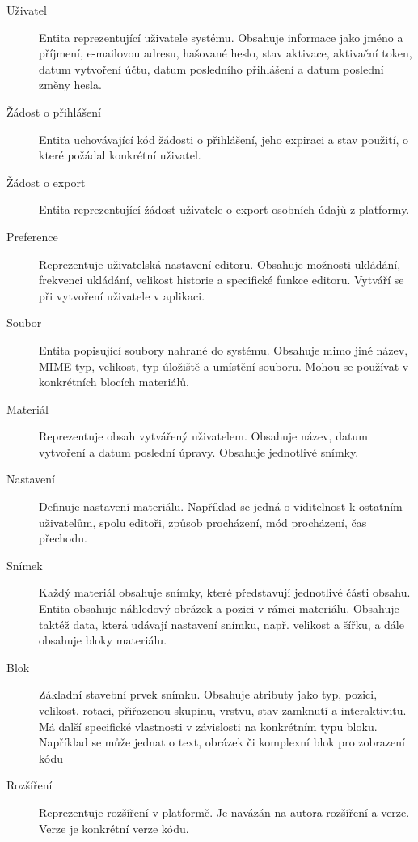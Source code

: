 \begin{description}
    \item[Uživatel] 
    Entita reprezentující uživatele systému. Obsahuje informace jako jméno a příjmení, e-mailovou adresu, hašované heslo, stav aktivace, aktivační token, datum vytvoření účtu, datum posledního přihlášení a datum poslední změny hesla.

    \item[Žádost o přihlášení] 
    Entita uchovávající kód žádosti o přihlášení, jeho expiraci a stav použití, o které požádal konkrétní uživatel.
    
    \item[Žádost o export]
    Entita reprezentující žádost uživatele o export osobních údajů z platformy.
    
    \item[Preference] 
    Reprezentuje uživatelská nastavení editoru. Obsahuje možnosti ukládání, frekvenci ukládání, velikost historie a specifické funkce editoru. Vytváří se při vytvoření uživatele v aplikaci.

    \item[Soubor] 
    Entita popisující soubory nahrané do systému. Obsahuje mimo jiné název, MIME typ, velikost, typ úložiště a umístění souboru. Mohou se používat v konkrétních blocích materiálů.
    
    \item[Materiál] 
    Reprezentuje obsah vytvářený uživatelem. Obsahuje název, datum vytvoření a datum poslední úpravy. Obsahuje jednotlivé snímky.
    
    \item[Nastavení] 
    Definuje nastavení materiálu. Například se jedná o viditelnost k ostatním uživatelům, spolu editoři, způsob procházení, mód procházení, čas přechodu.
    
    \item[Snímek] 
    Každý materiál obsahuje snímky, které představují jednotlivé části obsahu. Entita obsahuje náhledový obrázek a pozici v rámci materiálu. Obsahuje taktéž data, která udávají nastavení snímku, např. velikost a šířku, a dále obsahuje bloky materiálu.
    
    \item[Blok] 
    Základní stavební prvek snímku. Obsahuje atributy jako typ, pozici, velikost, rotaci, přiřazenou skupinu, vrstvu, stav zamknutí a interaktivitu. Má další specifické vlastnosti v závislosti na konkrétním typu bloku. Například se může jednat o text, obrázek či komplexní blok pro zobrazení kódu
    
    \item[Rozšíření]
    Reprezentuje rozšíření v platformě. Je navázán na autora rozšíření a verze. Verze je konkrétní verze kódu.
\end{description}

